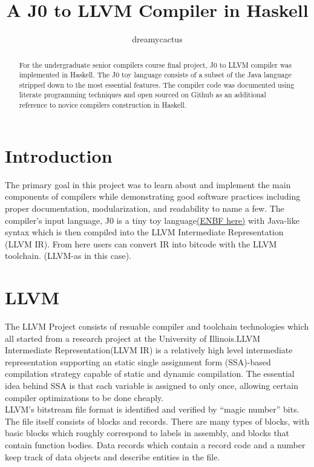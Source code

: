 \documentclass[11pt,a4paper]{article}
\begin{document}
\title{A J0 to LLVM Compiler in Haskell}
\author{dreamycactus}
\maketitle
\begin{abstract}
For the undergraduate senior compilers course final project, J0 to LLVM compiler was implemented 
in Haskell. The J0 toy language consists of a subset of the Java language stripped down to the most
essential features. The compiler code was documented using literate
programming techniques and open sourced on Github as an additional reference to novice compilers 
construction in Haskell.
\end{abstract}

\section{Introduction}
The primary goal in this project was to learn about and implement the main
components of compilers while demonstrating good software practices including
proper documentation, modularization, and readability to name a few. The compiler's input
language, J0 is a tiny toy language\href{http://gist.github.com/dreamycactus/20eac37eda6d954315db#file-gistfile1-txt}{(ENBF here)} with Java-like syntax which is
then compiled into the LLVM Intermediate Representation (LLVM IR).
From here users can convert IR into bitcode with the LLVM toolchain.
(LLVM-as in this case).

\section{LLVM}
The LLVM Project consists of resuable compiler and toolchain technologies which
all started from a research project at the University of Illinois.LLVM Intermediate
Representation(LLVM IR) is a relatively high level intermediate representation supporting an
static single assignment form (SSA)-based compilation strategy capable of static and dynamic
compilation. The essential idea behind SSA is that each variable is assigned to only once, allowing
certain compiler optimizations to be done cheaply.\\

LLVM's bitstream
file format is identified and verified by ``magic number'' bits. The file itself
consists of blocks and records. There are many types of blocks, with basic blocks
which roughly correspond to labels in assembly, and blocks that contain function bodies.
Data records which contain a record code and a number keep track of data objects and describe
entities in the file.
\end{document}
